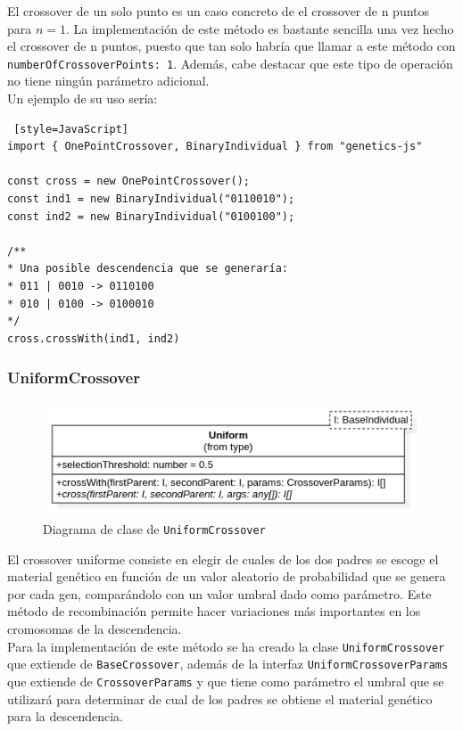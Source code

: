 El crossover de un solo punto \cite{de1975analysis} es un caso concreto de el crossover de n puntos para $n = 1$. La implementación de este método es bastante sencilla una vez hecho el crossover de n puntos, puesto que tan solo habría que llamar a este método con \texttt{numberOfCrossoverPoints: 1}. Además, cabe destacar que este tipo de operación no tiene ningún parámetro adicional. \\

Un ejemplo de su uso sería:

\begin{lstlisting} [style=JavaScript]
import { OnePointCrossover, BinaryIndividual } from "genetics-js"

const cross = new OnePointCrossover();
const ind1 = new BinaryIndividual("0110010");
const ind2 = new BinaryIndividual("0100100");

/**
* Una posible descendencia que se generaría:
* 011 | 0010 -> 0110100
* 010 | 0100 -> 0100010
*/
cross.crossWith(ind1, ind2)
\end{lstlisting}

\subsubsection{UniformCrossover}

\begin{figure}[ht]
    \centering
    \includegraphics[scale=0.6]{mem/images/cap-4/4.2.6(Crossover)/Uniform.png}
    \caption{Diagrama de clase de \texttt{UniformCrossover}}
    \label{fig:my_label}
\end{figure}

El crossover uniforme \cite{syswerda1989uniform} consiste en elegir de cuales de los dos padres se escoge el material genético en función de un valor aleatorio de probabilidad que se genera por cada gen, comparándolo con un valor umbral dado como parámetro. Este método de recombinación permite hacer variaciones más importantes en los cromosomas de la descendencia. \\

Para la implementación de este método se ha creado la clase \texttt{UniformCrossover} que extiende de \texttt{BaseCrossover}, además de la interfaz \texttt{UniformCrossoverParams} que extiende de \texttt{CrossoverParams} y que tiene como parámetro el umbral que se utilizará para determinar de cual de los padres se obtiene el material genético para la descendencia. \\

